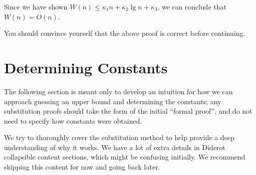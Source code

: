 \begin{gram}
Since we have shown $W(n) \leq \kappa_1 n + \kappa_2 \lg n + \kappa_3$, we can
conclude that $W(n) = O(n)$.
\end{gram}

\begin{important}
You should convince yourself that the above proof is correct before continuing.
\end{important}

\section{Determining Constants}
\begin{note}
The following section is meant only to develop an intuition for how we can approach
guessing an upper bound and determining the constants; any substitution
proofs should take the form of the initial ``formal proof'', and do not need to
specify how constants were obtained.
\end{note}

\begin{note}
We try to thoroughly cover the substitution method to help
provide a deep understanding of why it works. We have a lot of extra details
in Diderot collapsible content sections, which might be confusing initially.
We recommend skipping this content for now and going back later.
\end{note}

